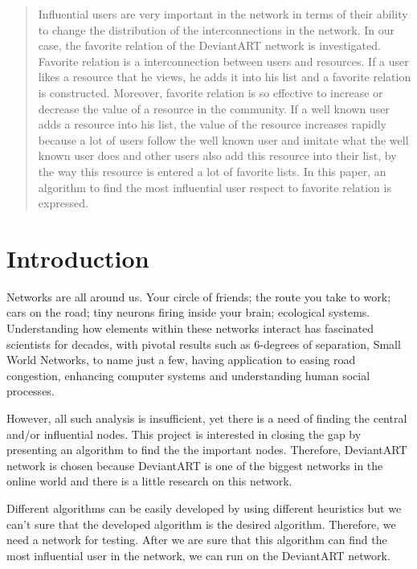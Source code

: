 \documentclass[12pt,a4paper]{report}
\begin{document}
\begin{abstract}

	\par Influential users are very important in the network in terms of their ability to change the distribution of the interconnections in the network. In our case, the favorite relation of the DeviantART network is investigated. Favorite relation is a interconnection between users and resources. If a user likes a resource that he views, he adds it into his list and a favorite relation is constructed. Moreover, favorite relation is so effective to increase or decrease the value of a resource in the community. If a well known user adds a resource into his list, the value of the resource increases rapidly because a lot of users follow the well known user and imitate what the well known user does and other users also add this resource into their list, by the way this resource is entered a lot of favorite lists. In this paper, an algorithm to find the most influential user respect to favorite relation is expressed. 

\end{abstract}

\tableofcontents

\chapter{Introduction}
	
	\par \hspace{0.6cm}Networks are all around us.  Your circle of friends; the route you take to work; cars on the road; tiny neurons firing inside your brain; ecological systems.  Understanding how elements within these networks interact has fascinated scientists for decades, with pivotal results such as 6-degrees of separation, Small World Networks, to name just a few, having application to easing road congestion, enhancing computer systems and understanding human social processes. 

	\par However, all such analysis is insufficient, yet there is a need of finding the central and/or influential nodes. This project is interested in closing the gap by presenting an algorithm to find the the important nodes. Therefore, DeviantART network is chosen because DeviantART is one of the biggest networks in the online world and there is a little research on this network. 

	\par Different algorithms can be easily developed by using different heuristics but we can't sure that the developed algorithm is the desired algorithm. Therefore, we need a network for testing. After we are sure that this algorithm can find the most influential user in the network, we can run on the DeviantART network.
\end{document}

